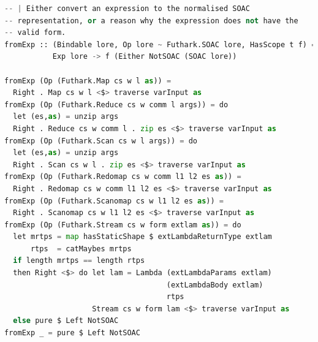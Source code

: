 \documentclass[11pt]{article}
\begin{document}
\begin{lstlisting}[language=Python,caption=Implementing scanomap as SOAC]
-- | Either convert an expression to the normalised SOAC
-- representation, or a reason why the expression does not have the
-- valid form.
fromExp :: (Bindable lore, Op lore ~ Futhark.SOAC lore, HasScope t f) =>
           Exp lore -> f (Either NotSOAC (SOAC lore))

fromExp (Op (Futhark.Map cs w l as)) =
  Right . Map cs w l <$> traverse varInput as
fromExp (Op (Futhark.Reduce cs w comm l args)) = do
  let (es,as) = unzip args
  Right . Reduce cs w comm l . zip es <$> traverse varInput as
fromExp (Op (Futhark.Scan cs w l args)) = do
  let (es,as) = unzip args
  Right . Scan cs w l . zip es <$> traverse varInput as
fromExp (Op (Futhark.Redomap cs w comm l1 l2 es as)) =
  Right . Redomap cs w comm l1 l2 es <$> traverse varInput as
fromExp (Op (Futhark.Scanomap cs w l1 l2 es as)) =
  Right . Scanomap cs w l1 l2 es <$> traverse varInput as
fromExp (Op (Futhark.Stream cs w form extlam as)) = do
  let mrtps = map hasStaticShape $ extLambdaReturnType extlam
      rtps  = catMaybes mrtps
  if length mrtps == length rtps
  then Right <$> do let lam = Lambda (extLambdaParams extlam)
                                     (extLambdaBody extlam)
                                     rtps
                    Stream cs w form lam <$> traverse varInput as
  else pure $ Left NotSOAC
fromExp _ = pure $ Left NotSOAC
\end{lstlisting}

\newpage
\end{document}
